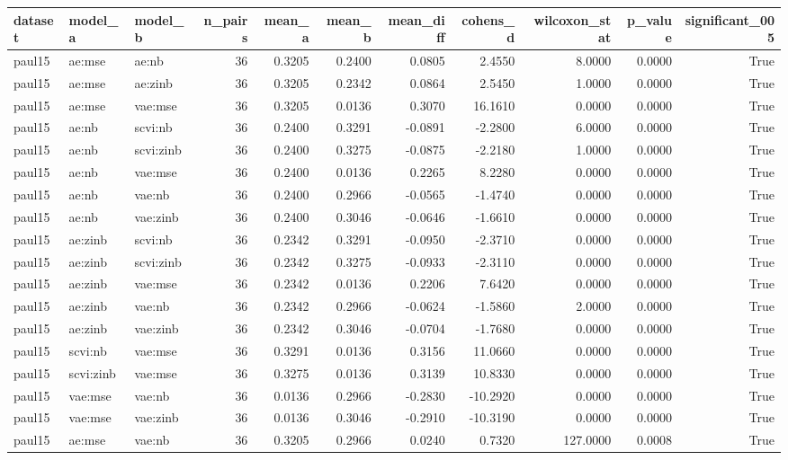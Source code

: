 \begin{tabular}{lllrrrrrrrr}
\toprule
dataset & model\_a & model\_b & n\_pairs & mean\_a & mean\_b & mean\_diff & cohens\_d & wilcoxon\_stat & p\_value & significant\_005 \\
\midrule
paul15 & ae:mse & ae:nb & 36 & 0.3205 & 0.2400 & 0.0805 & 2.4550 & 8.0000 & 0.0000 & True \\
paul15 & ae:mse & ae:zinb & 36 & 0.3205 & 0.2342 & 0.0864 & 2.5450 & 1.0000 & 0.0000 & True \\
paul15 & ae:mse & vae:mse & 36 & 0.3205 & 0.0136 & 0.3070 & 16.1610 & 0.0000 & 0.0000 & True \\
paul15 & ae:nb & scvi:nb & 36 & 0.2400 & 0.3291 & -0.0891 & -2.2800 & 6.0000 & 0.0000 & True \\
paul15 & ae:nb & scvi:zinb & 36 & 0.2400 & 0.3275 & -0.0875 & -2.2180 & 1.0000 & 0.0000 & True \\
paul15 & ae:nb & vae:mse & 36 & 0.2400 & 0.0136 & 0.2265 & 8.2280 & 0.0000 & 0.0000 & True \\
paul15 & ae:nb & vae:nb & 36 & 0.2400 & 0.2966 & -0.0565 & -1.4740 & 0.0000 & 0.0000 & True \\
paul15 & ae:nb & vae:zinb & 36 & 0.2400 & 0.3046 & -0.0646 & -1.6610 & 0.0000 & 0.0000 & True \\
paul15 & ae:zinb & scvi:nb & 36 & 0.2342 & 0.3291 & -0.0950 & -2.3710 & 0.0000 & 0.0000 & True \\
paul15 & ae:zinb & scvi:zinb & 36 & 0.2342 & 0.3275 & -0.0933 & -2.3110 & 0.0000 & 0.0000 & True \\
paul15 & ae:zinb & vae:mse & 36 & 0.2342 & 0.0136 & 0.2206 & 7.6420 & 0.0000 & 0.0000 & True \\
paul15 & ae:zinb & vae:nb & 36 & 0.2342 & 0.2966 & -0.0624 & -1.5860 & 2.0000 & 0.0000 & True \\
paul15 & ae:zinb & vae:zinb & 36 & 0.2342 & 0.3046 & -0.0704 & -1.7680 & 0.0000 & 0.0000 & True \\
paul15 & scvi:nb & vae:mse & 36 & 0.3291 & 0.0136 & 0.3156 & 11.0660 & 0.0000 & 0.0000 & True \\
paul15 & scvi:zinb & vae:mse & 36 & 0.3275 & 0.0136 & 0.3139 & 10.8330 & 0.0000 & 0.0000 & True \\
paul15 & vae:mse & vae:nb & 36 & 0.0136 & 0.2966 & -0.2830 & -10.2920 & 0.0000 & 0.0000 & True \\
paul15 & vae:mse & vae:zinb & 36 & 0.0136 & 0.3046 & -0.2910 & -10.3190 & 0.0000 & 0.0000 & True \\
paul15 & ae:mse & vae:nb & 36 & 0.3205 & 0.2966 & 0.0240 & 0.7320 & 127.0000 & 0.0008 & True \\

\end{tabular}
